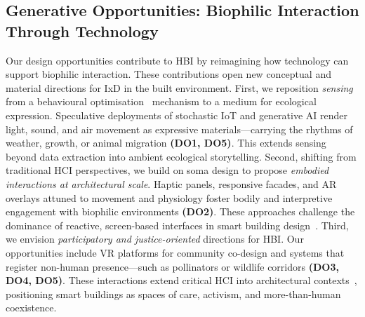 \subsection{Generative Opportunities: Biophilic Interaction Through Technology}
Our design opportunities contribute to HBI by reimagining how technology can support biophilic interaction. These contributions open new conceptual and material directions for IxD in the built environment. First, we reposition \emph{sensing} from a behavioural optimisation~\cite{chhaglani2022flowsense} mechanism to a medium for ecological expression. Speculative deployments of stochastic IoT and generative AI render light, sound, and air movement as expressive materials---carrying the rhythms of weather, growth, or animal migration \textbf{(DO1, DO5)}. This extends sensing beyond data extraction into ambient ecological storytelling. Second, shifting from traditional HCI perspectives, we build on soma design to propose \emph{embodied interactions at architectural scale}. Haptic panels, responsive facades, and AR overlays attuned to movement and physiology foster bodily and interpretive engagement with biophilic environments \textbf{(DO2)}. These approaches challenge the dominance of reactive, screen-based interfaces in smart building design~\cite{tschaepe2021somaesthetics, rao2025smart}. Third, we envision \emph{participatory and justice-oriented} directions for HBI. Our opportunities include VR platforms for community co-design and systems that register non-human presence—such as pollinators or wildlife corridors \textbf{(DO3, DO4, DO5)}. These interactions extend critical HCI into architectural contexts~\cite{hirsch2023re}, positioning smart buildings as spaces of care, activism, and more-than-human coexistence.


